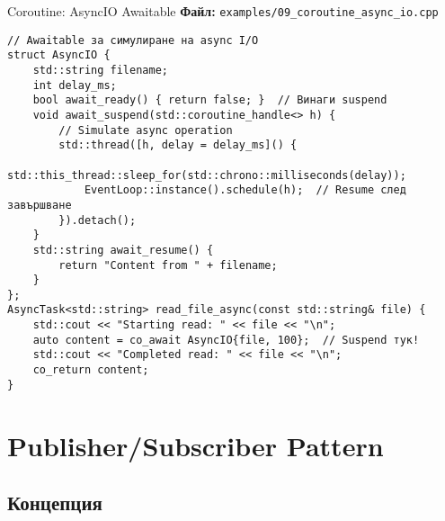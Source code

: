\documentclass[aspectratio=169]{beamer}
\begin{document}
\begin{frame}[fragile]{Coroutine: AsyncIO Awaitable}
\textbf{Файл:} \texttt{examples/09\_coroutine\_async\_io.cpp}
\begin{lstlisting}[basicstyle=\ttfamily\tiny]
// Awaitable за симулиране на async I/O
struct AsyncIO {
    std::string filename;
    int delay_ms;
    bool await_ready() { return false; }  // Винаги suspend
    void await_suspend(std::coroutine_handle<> h) {
        // Simulate async operation
        std::thread([h, delay = delay_ms]() {
            std::this_thread::sleep_for(std::chrono::milliseconds(delay));
            EventLoop::instance().schedule(h);  // Resume след завършване
        }).detach();
    }
    std::string await_resume() {
        return "Content from " + filename;
    }
};
AsyncTask<std::string> read_file_async(const std::string& file) {
    std::cout << "Starting read: " << file << "\n";
    auto content = co_await AsyncIO{file, 100};  // Suspend тук!
    std::cout << "Completed read: " << file << "\n";
    co_return content;
}
\end{lstlisting}
\end{frame}

\section{Publisher/Subscriber Pattern}

\subsection{Концепция}
\end{document}
